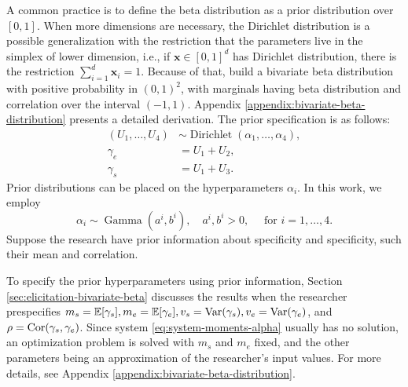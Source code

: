 A common practice is to define the beta distribution as a prior distribution
over $[0,1]$. When more dimensions are necessary, the Dirichlet distribution
is a possible generalization with the restriction that the parameters live in
the simplex of lower dimension, i.e., if $\boldsymbol{x} \in [0,1]^d$ has Dirichlet
distribution, there is the restriction $\sum_{i=1}^d \boldsymbol{x}_i = 1$.
Because of that, \textcite{olkin2015constructions} build a bivariate beta distribution
with positive probability in $(0,1)^2$, with marginals having beta
distribution and correlation over the interval $(-1,1)$. Appendix
\ref{appendix:bivariate-beta-distribution} presents a detailed derivation. The
prior specification is as follows:
\begin{equation*}
  \begin{aligned}
    (U_1, \dots, U_4) & \sim \operatorname{Dirichlet}(\alpha_1, \dots, \alpha_4), \\
    \gamma_e          & = U_1 + U_2,                                              \\
    \gamma_s          & = U_1 + U_3.
  \end{aligned}
\end{equation*}
Prior distributions can be placed on the hyperparameters $\alpha_i$. In this work,
we employ
\begin{equation*}
  \alpha_i \sim \operatorname{Gamma}(a^i, b^i), \quad a^i, b^i > 0, \quad \text{ for } i = 1,\dots,4.
\end{equation*}
Suppose the research have prior information about specificity and specificity,
such their mean and correlation.

To specify the prior hyperparameters using prior information, Section
\ref{sec:elicitation-bivariate-beta} discusses the results when the
researcher prespecifies $m_s = \mathbb{E}[\gamma_s], m_e = \mathbb{E}[\gamma_e], v_s = \operatorname{Var}(\gamma_s),
  v_e = \operatorname{Var}(\gamma_e)$, and $\rho  = \operatorname{Cor}(\gamma_s, \gamma_e)$. Since system
\eqref{eq:system-moments-alpha} usually has no solution, an optimization
problem is solved with $m_s$ and $m_e$ fixed, and the other parameters being
an approximation of the researcher's input values. For more details, see Appendix \ref{appendix:bivariate-beta-distribution}.


